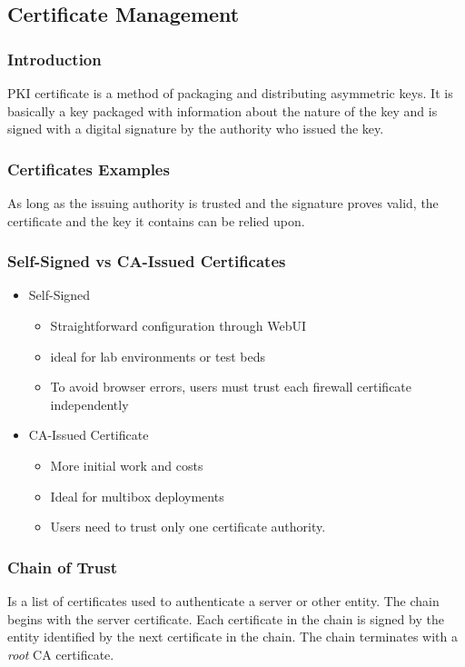 \subsection{Certificate Management}
\subsubsection{Introduction}
PKI certificate is a method of packaging and distributing asymmetric keys.
It is basically a key packaged with information about the nature of the key and is signed with a digital signature by the authority who issued the key.

\subsubsection{Certificates Examples}
As long as the issuing authority is trusted and the signature proves valid, the certificate and the key it contains can be relied upon.

\subsubsection{Self-Signed vs CA-Issued Certificates}
\begin{itemize}
    \item Self-Signed
        \begin{itemize}
            \item Straightforward configuration through WebUI
            \item ideal for lab environments or test beds
            \item To avoid browser errors, users must trust each firewall certificate independently
        \end{itemize}
    \item CA-Issued Certificate
        \begin{itemize}
            \item More initial work and costs
            \item Ideal for multibox deployments
            \item Users need to trust only one certificate authority.
        \end{itemize}
\end{itemize}

\subsubsection{Chain of Trust}
Is a list of certificates used to authenticate a server or other entity.
The chain begins with the server certificate.
Each certificate in the chain is signed by the entity identified by the next certificate in the chain.
The chain terminates with a \textit{root} CA certificate.

